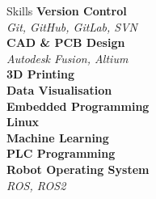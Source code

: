 \documentclass{custom-resume}
\begin{document}
\begin{minipage}[t]{0.25\textwidth}
\begin{section}{Skills}
    \textbf{Version Control} \\[2pt]
    \textit{Git, GitHub, GitLab, SVN} \\[8pt]

    \textbf{CAD \& PCB Design} \\[2pt]
    \textit{Autodesk Fusion, Altium} \\[8pt]

    \textbf{3D Printing} \\[8pt]

    \textbf{Data Visualisation} \\[8pt]

    \textbf{Embedded Programming} \\[8pt]

    \textbf{Linux} \\[8pt]

    \textbf{Machine Learning} \\[8pt]

    \textbf{PLC Programming} \\[8pt]

    \textbf{Robot Operating System} \\[2pt]
    \textit{ROS, ROS2}
  \end{section}

\end{minipage}%
\hspace{0.06\textwidth}
\end{document}
